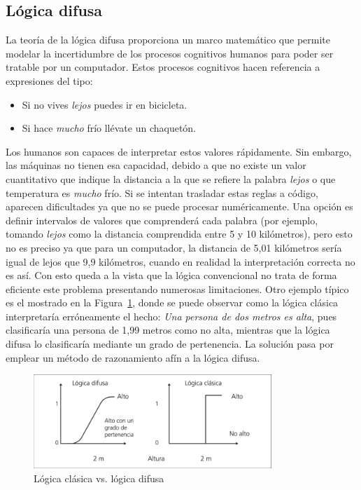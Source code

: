 \subsection{Lógica difusa}
La teoría de la lógica difusa proporciona un marco matemático que permite modelar la incertidumbre de los procesos cognitivos humanos para poder ser tratable por un computador. Estos procesos cognitivos hacen referencia a expresiones del tipo:
\begin{itemize}
	\item Si no vives \textit{lejos} puedes ir en bicicleta.
	\item Si hace \textit{mucho} frío llévate un chaquetón.
\end{itemize}
Los humanos son capaces de interpretar estos valores rápidamente. Sin embargo, las máquinas no tienen esa capacidad, debido a que no existe un valor cuantitativo que indique la distancia a la que se refiere la palabra \textit{lejos} o que temperatura es \textit{mucho} frío. Si se intentan trasladar estas reglas a código, aparecen dificultades ya que no se puede procesar numéricamente. Una opción es definir intervalos de valores que comprenderá cada palabra (por ejemplo, tomando \textit{lejos} como la distancia comprendida entre 5 y 10 kilómetros), pero esto no es preciso ya que para un computador, la distancia de 5,01 kilómetros sería igual de lejos que 9,9 kilómetros, cuando en realidad la interpretación correcta no es así. Con esto queda a la vista que la lógica convencional no trata de forma eficiente este problema presentando numerosas limitaciones. Otro ejemplo típico es el mostrado en la Figura~\ref{fig:ejemplo_logica}, donde se puede observar como la lógica clásica interpretaría erróneamente el hecho: \textit{Una persona de dos metros es alta}, pues clasificaría una persona de 1,99 metros como no alta, mientras que la lógica difusa lo clasificaría mediante un grado de pertenencia. La solución pasa por emplear un método de razonamiento afín a la lógica difusa.\\
\begin{figure}[!h]
	\centering
	\includegraphics[width=9cm]{figs/tipos_logica.png}
	\caption{Lógica clásica vs. lógica difusa}
        \label{fig:ejemplo_logica}
\end{figure}

